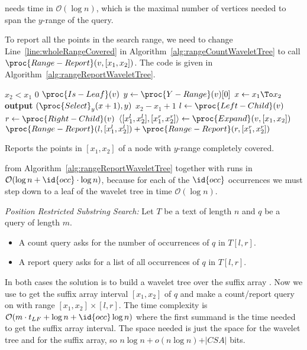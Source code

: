 \begin{Proof}
   needs time in $\mathcal{O}(\log n)$, which is the maximal number of vertices needed to span the $y$-range of the query.

  To report all the points in the search range, we need to change Line~\ref{line:wholeRangeCovered} in Algorithm~\ref{alg:rangeCountWaveletTree} to call $\proc{Range-Report}(v, [x_1, x_2])$. The code is given in Algorithm~\ref{alg:rangeReportWaveletTree}.

  \begin{algorithm}[htb]
    \begin{codebox}
      \li \If $x_2 < x_1$
          \Then
      \li   \Return $0$
          \End
      \li \If $\proc{Is-Leaf}(v)$
          \Then
      \li   $y \gets \proc{Y-Range}(v)[0]$
      \li   \For $x \gets x_1 \To x_2$
            \Do
      \li     \textbf{output} $(\proc{Select}_y(x + 1), y)$
            \End
      \li   \Return $x_2 - x_1 + 1$
      \li \Else
      \li   $l \gets \proc{Left-Child}(v)$
      \li   $r \gets \proc{Right-Child}(v)$
      \li   $\langle [x_1^l, x_2^l], [x_1^r, x_2^r] \rangle \gets \proc{Expand}(v, [x_1, x_2])$
      \li   \Return $\proc{Range-Report}(l, [x_1^l, x_2^l]) + \proc{Range-Report}(r, [x_1^r, x_2^r])$
          \End
    \end{codebox}
    \caption{Reports the points in $[x_1, x_2]$ of a node with $y$-range completely covered.}
    \label{alg:rangeReportWaveletTree}
  \end{algorithm}

   from Algorithm~\ref{alg:rangeReportWaveletTree} together with  runs in $\mathcal{O}(\log n + \id{occ} \cdot \log n)$, because for each of the $\id{occ}$ occurrences we must step down to a leaf of the wavelet tree in time $\mathcal{O}(\log n)$.
\end{Proof}

\begin{Example}{\emph{Position Restricted Substring Search:}}
  Let $T$ be a text of length $n$ and $q$ be a query of length $m$.
  \begin{itemize}
    \item A count query asks for the number of occurrences of $q$ in $T[l,r]$.
    \item A report query asks for a list of all occurrences of $q$ in $T[l,r]$.
  \end{itemize}
  In both cases the solution is to build a wavelet tree  over the suffix array . Now we use  to get the suffix array interval $[x_1, x_2]$ of $q$ and make a count/report query on  with range $[x_1, x_2] \times [l, r]$. The time complexity is $\mathcal{O}(m \cdot t_{LF} + \log n + \id{occ}\log n)$ where the first summand is the time needed to get the suffix array interval. The space needed is just the space for the wavelet tree and for the suffix array, so $n \log n + o(n \log n) + \vert CSA\vert$ bits.
\end{Example}
